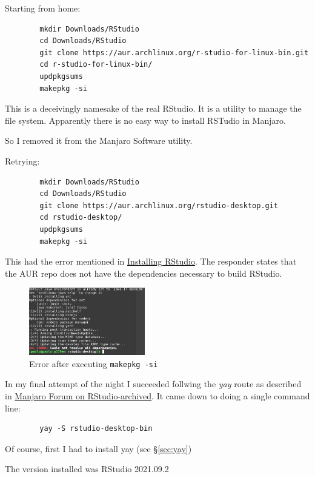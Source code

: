 \documentclass[]{scrartcl}
\begin{document}
	Starting from home:
	
	\begin{verbatim}
		mkdir Downloads/RStudio
		cd Downloads/RStudio
		git clone https://aur.archlinux.org/r-studio-for-linux-bin.git
		cd r-studio-for-linux-bin/
		updpkgsums
		makepkg -si	
	\end{verbatim}
	
	This is a deceivingly namesake of the real RStudio. It is a utility to manage the file system.
	Apparently there is no easy way to install RSTudio in Manjaro.
	
	So I removed it from the Manjaro Software utility.
	
	Retrying:
	
	\begin{verbatim}
		mkdir Downloads/RStudio
		cd Downloads/RStudio
		git clone https://aur.archlinux.org/rstudio-desktop.git
		cd rstudio-desktop/
		updpkgsums
		makepkg -si	
	\end{verbatim}
	
	This had the error mentioned in \href{https://forum.manjaro.org/t/rstudio-on-pinebook-pro-aarch64/60827/6?u=padames}{Installing RStudio}. The responder states that the AUR repo does not have the dependencies necessary to build RStudio.
	
	\begin{figure}[!htb]
		\centering
		\caption{Error after executing \texttt{makepkg -si}}
		\includegraphics[width=0.45\textwidth]{Images/ErrorInstallingAUR.png}
	\end{figure}
	
	In my final attempt of the night I succeeded follwing the \textit{yay} route as described in \href{https://archived.forum.manjaro.org/t/using-the-statistical-package-r-in-manjaro-with-rstudio/484}{Manjaro Forum on RStudio-archived}. 
	It came down to doing a single command line:
	\begin{verbatim}
		yay -S rstudio-desktop-bin
	\end{verbatim}
	Of course, first I had to install yay (see \S\ref{sec:yay})
	
	The version installed was RStudio 2021.09.2
	
\end{document}

